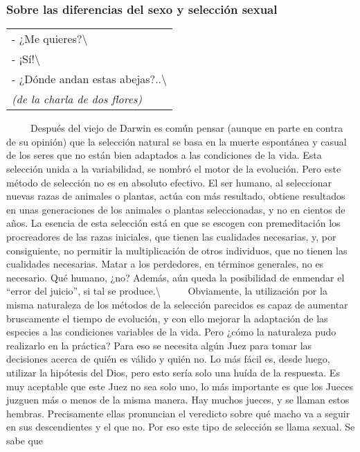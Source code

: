 \protect\hypertarget{M4}{}{}

\subsubsection{Sobre las diferencias del sexo y selección
sexual}\label{sobre-las-diferencias-del-sexo-y-selecciuxf3n-sexual}

\begin{longtable}[]{@{}l@{}}
\toprule
- ¿Me quieres?\textbackslash{}\tabularnewline
- ¡Sí!\textbackslash{}\tabularnewline
- ¿Dónde andan estas abejas?..\textbackslash{}\tabularnewline
\emph{(de la charla de dos flores)}\tabularnewline
\bottomrule
\end{longtable}

~ ~ ~ Después del viejo de Darwin es común pensar (aunque en parte en
contra de su opinión) que la selección natural se basa en la muerte
espontánea y casual de los seres que no están bien adaptados a las
condiciones de la vida. Esta selección unida a la variabilidad, se
nombró el motor de la evolución. Pero este método de selección no es en
absoluto efectivo. El ser humano, al seleccionar nuevas razas de
animales o plantas, actúa con más resultado, obtiene resultados en unas
generaciones de los animales o plantas seleccionadas, y no en cientos de
años. La esencia de esta selección está en que se escogen con
premeditación los procreadores de las razas iniciales, que tienen las
cualidades necesarias, y, por consiguiente, no permitir la
multiplicación de otros individuos, que no tienen las cualidades
necesarias. Matar a los perdedores, en términos generales, no es
necesario. Qué humano, ¿no? Además, aún queda la posibilidad de enmendar
el ``error del juicio'', si tal se produce.\textbackslash{} ~ ~ ~
Obviamente, la utilización por la misma naturaleza de los métodos de la
selección parecidos es capaz de aumentar bruscamente el tiempo de
evolución, y con ello mejorar la adaptación de las especies a las
condiciones variables de la vida. Pero ¿cómo la naturaleza pudo
realizarlo en la práctica? Para eso se necesita algún Juez para tomar
las decisiones acerca de quién es válido y quién no. Lo más fácil es,
desde luego, utilizar la hipótesis del Dios, pero esto sería solo una
huída de la respuesta. Es muy aceptable que este Juez no sea solo uno,
lo más importante es que los Jueces juzguen más o menos de la misma
manera. Hay muchos jueces, y se llaman estos hembras. Precisamente ellas
pronuncian el veredicto sobre qué macho va a seguir en sus descendientes
y el que no. Por eso este tipo de selección se llama sexual. Se sabe que
